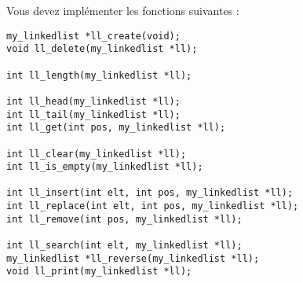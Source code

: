 
\noindent Vous devez implémenter les fonctions suivantes :

\bigskip

\lstset{language=C}
\begin{lstlisting}[frame=single,title={Liste des fonctions pour une liste chaînée}]
my_linkedlist *ll_create(void);
void ll_delete(my_linkedlist *ll);

int ll_length(my_linkedlist *ll);

int ll_head(my_linkedlist *ll);
int ll_tail(my_linkedlist *ll);
int ll_get(int pos, my_linkedlist *ll);

int ll_clear(my_linkedlist *ll);
int ll_is_empty(my_linkedlist *ll);

int ll_insert(int elt, int pos, my_linkedlist *ll);
int ll_replace(int elt, int pos, my_linkedlist *ll);
int ll_remove(int pos, my_linkedlist *ll);

int ll_search(int elt, my_linkedlist *ll);
my_linkedlist *ll_reverse(my_linkedlist *ll);
void ll_print(my_linkedlist *ll);
\end{lstlisting}



